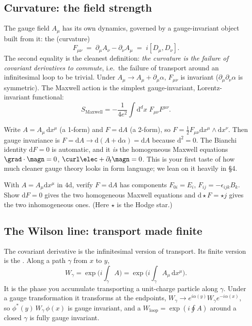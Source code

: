 \documentclass[11pt]{article}
\newcommand{\dd}{\mathrm{d}}                 %
\newcommand{\half}{\tfrac12}
\begin{document}
\subsection{Curvature: the field strength}

The gauge field $A_\mu$ has its own dynamics, governed by a gauge-invariant object
built from it: the  (curvature)
\[
F_{\mu\nu} \;=\; \partial_\mu A_\nu - \partial_\nu A_\mu \;=\; i[D_\mu, D_\nu].
\]
The second equality is the cleanest definition: \emph{the curvature is the failure of
covariant derivatives to commute}, i.e.\ the failure of transport around an
infinitesimal loop to be trivial. Under $A_\mu \to A_\mu + \partial_\mu\alpha$,
$F_{\mu\nu}$ is invariant ($\partial_\mu\partial_\nu\alpha$ is symmetric). The
Maxwell action is the simplest gauge-invariant, Lorentz-invariant functional:
\[
S_{\text{Maxwell}} = -\frac{1}{4e^2}\int \dd^d x\; F_{\mu\nu}F^{\mu\nu}.
\]

\begin{eexample}
Write $A = A_\mu\,\dd x^\mu$ (a 1-form) and $F = \dd A$ (a 2-form), so
$F = \half F_{\mu\nu}\dd x^\mu\wedge \dd x^\nu$. Then gauge invariance is
$F = \dd A \to \dd(A + \dd\alpha) = \dd A$ because $\dd^2 = 0$. The Bianchi identity
$\dd F = 0$ is automatic, and it \emph{is} the homogeneous Maxwell equations
$\grad\cdot\magn = 0$, $\curl\elec + \partial_t\magn = 0$. This is your first taste of
how much cleaner gauge theory looks in form language; we lean on it heavily in \S4.
\end{eexample}

\begin{xca}
With $A=A_\mu\dd x^\mu$ in $4$d, verify $F=\dd A$ has components $F_{0i}=E_i$,
$F_{ij}=-\epsilon_{ijk}B_k$. Show $\dd F=0$ gives the two homogeneous Maxwell equations
and $\dd \star F = \star j$ gives the two inhomogeneous ones. (Here $\star$ is the Hodge
star.)
\end{xca}

\subsection{The Wilson line: transport made finite}

The covariant derivative is the infinitesimal version of transport. Its finite version
is the . Along a path $\gamma$ from $x$ to $y$,
\[
W_\gamma = \exp\!\Big(i\int_\gamma A\Big) = \exp\!\Big(i\int_\gamma A_\mu\,\dd x^\mu\Big).
\]
It is the phase you accumulate transporting a unit-charge particle along $\gamma$. Under
a gauge transformation it transforms at the endpoints, $W_\gamma \to e^{i\alpha(y)}
W_\gamma e^{-i\alpha(x)}$, so $\phi^*(y)\,W_\gamma\,\phi(x)$ is gauge invariant, and a
 $W_{\text{loop}} = \exp(i\oint A)$ around a closed $\gamma$ is fully
gauge invariant.
\end{document}
